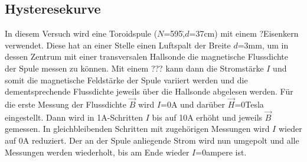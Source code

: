    \subsection{Hysteresekurve}

        In diesem Versuch wird eine Toroidspule ($N$=595\.,$d$=37\si{\centi\meter}) mit einem ?Eisenkern
        verwendet. Diese hat an einer Stelle einen Luftspalt der Breite $d$=3\si{\milli\meter}, um in 
        dessen Zentrum mit einer transversalen Hallsonde die magnetische Flussdichte der Spule messen zu können.
        Mit einem ??? kann dann die Stromstärke $I$ und somit die  magnetische Feldstärke der Spule 
        variiert werden und die dementsprechende Flussdichte jeweils über die Hallsonde abgelesen werden.
        Für die erste Messung der Flussdichte $\vec B$ wird $I$=0\si{\ampere} und darüber $\vec H$=0\si{Tesla}
        eingestellt. Dann wird in 1\si{\ampere}-Schritten $I$ bis auf 10\si{\ampere} erhöht und jeweils $\vec B$
        gemessen. In gleichbleibenden Schritten mit zugehörigen Messungen wird $I$ wieder auf 0\si{\ampere}
        reduziert. Der an der Spule anliegende Strom wird nun umgepolt und alle Messungen werden
        wiederholt, bis am Ende wieder $I$=0\si{ampere} ist.

        
        

        

        

